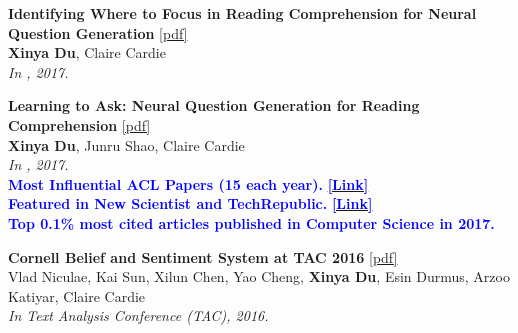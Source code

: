 \begin{enumerate}[{[}1{]},leftmargin=*]
\item
{\bf Identifying Where to Focus in Reading Comprehension for Neural Question Generation}
\href{https://aclanthology.org/D17-1219.pdf}{{[pdf]}} \\
{{\bf Xinya Du}, Claire Cardie} \\
{\it In \EMNLP, 2017.}\\

\item
{\bf Learning to Ask: Neural Question Generation for Reading Comprehension}  
\href{https://aclanthology.org/P17-1123.pdf}{{[pdf]}} \\
{{\bf Xinya Du}, Junru Shao, Claire Cardie}    \\
{\it In \ACL, 2017.}\\
% 
{\textcolor{blue}{\textbf{Most Influential ACL Papers (15 each year).}}} \href{https://www.paperdigest.org/2024/05/most-influential-acl-papers-2024-05/}{\textcolor{blue}{\textbf{[Link]}}} \\ 
\textbf{{\textcolor{blue}{Featured in New Scientist and TechRepublic.}}}
\textbf{\href{https://www.newscientist.com/article/2130205-inquisitive-bot-asks-questions-to-test-your-understanding/}{\textcolor{blue}{[Link]}}} \\ 
{\textcolor{blue}{\textbf{Top 0.1\% most cited articles published in Computer Science in 2017.}}} \\
% 


% 

\item
{\bf Cornell Belief and Sentiment System at TAC 2016} 
\href{https://tac.nist.gov/publications/2016/participant.papers/TAC2016.cornpittmich.proceedings.pdf}{{{[pdf]}}} \\
{Vlad Niculae, Kai Sun, Xilun Chen, Yao Cheng, {\bf Xinya Du}, Esin Durmus, Arzoo Katiyar, Claire Cardie} \\
{\it In Text Analysis Conference (TAC), 2016.}\\

\end{enumerate}





